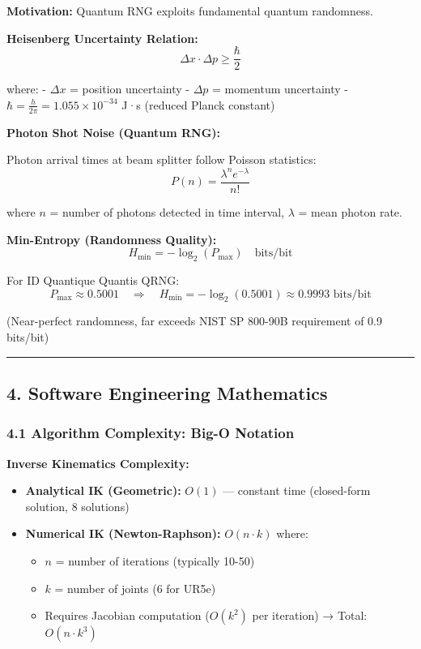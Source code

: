 \documentclass[
]{article}
\providecommand{\tightlist}{%
  \setlength{\itemsep}{0pt}\setlength{\parskip}{0pt}}
\begin{document}
\textbf{Motivation:} Quantum RNG exploits fundamental quantum
randomness.

\textbf{Heisenberg Uncertainty Relation:} \[
\Delta x \cdot \Delta p \geq \frac{\hbar}{2}
\]

where: - \(\Delta x\) = position uncertainty - \(\Delta p\) = momentum
uncertainty - \(\hbar = \frac{h}{2\pi} = 1.055 \times 10^{-34}\) J·s
(reduced Planck constant)

\textbf{Photon Shot Noise (Quantum RNG):}

Photon arrival times at beam splitter follow Poisson statistics: \[
P(n) = \frac{\lambda^n e^{-\lambda}}{n!}
\]

where \(n\) = number of photons detected in time interval, \(\lambda\) =
mean photon rate.

\textbf{Min-Entropy (Randomness Quality):} \[
H_{\min} = -\log_2(P_{\max}) \quad \text{bits/bit}
\]

For ID Quantique Quantis QRNG: \[
P_{\max} \approx 0.5001 \quad \Rightarrow \quad H_{\min} = -\log_2(0.5001) \approx 0.9993 \text{ bits/bit}
\]

(Near-perfect randomness, far exceeds NIST SP 800-90B requirement of 0.9
bits/bit)

\begin{center}\rule{0.5\linewidth}{0.5pt}\end{center}

\hypertarget{software-engineering-mathematics}{%
\subsection{4. Software Engineering
Mathematics}\label{software-engineering-mathematics}}

\hypertarget{algorithm-complexity-big-o-notation}{%
\subsubsection{4.1 Algorithm Complexity: Big-O
Notation}\label{algorithm-complexity-big-o-notation}}

\textbf{Inverse Kinematics Complexity:}

\begin{itemize}
\tightlist
\item
  \textbf{Analytical IK (Geometric):} \(O(1)\) --- constant time
  (closed-form solution, 8 solutions)
\item
  \textbf{Numerical IK (Newton-Raphson):} \(O(n \cdot k)\) where:

  \begin{itemize}
  \tightlist
  \item
    \(n\) = number of iterations (typically 10-50)
  \item
    \(k\) = number of joints (6 for UR5e)
  \item
    Requires Jacobian computation (\(O(k^2)\) per iteration) → Total:
    \(O(n \cdot k^3)\)
  \end{itemize}
\end{itemize}
\end{document}
